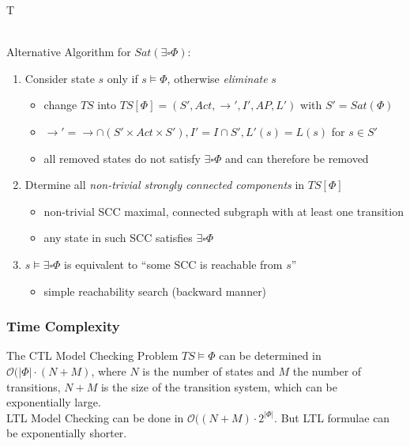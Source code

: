 \documentclass[a4paper, 10pt]{article}
\begin{document}
\begin{mdframed}
\begin{algorithm}[H]
{{{            
        }
    }
}
\Return T
\end{algorithm}
\ \\ Alternative Algorithm for $Sat(\exists\square\Phi)$: \\
\begin{enumerate}
    \item Consider state $s$ only if $s\models\Phi$, otherwise \emph{eliminate} $s$
    \begin{itemize}
        \item change $TS$ into $TS[\Phi]=(S',Act,\to',I',AP,L')$ with $S'=Sat(\Phi)$
        \item $\to'=\to\cap(S'\times Act\times S'), I'=I\cap S', L'(s)=L(s)$ for $s\in S'$
        \item[\follows] all removed states do not satisfy $\exists\square\Phi$ and can therefore be removed
    \end{itemize}
    \item Dtermine all \emph{non-trivial strongly connected components} in $TS[\Phi]$
    \begin{itemize}
        \item non-trivial SCC \follows maximal, connected subgraph with at least one transition
        \item[\follows] any state in such SCC satisfies $\exists\square\Phi$
    \end{itemize}
    \item $s\models\exists\square\Phi$ is equivalent to ``some SCC is reachable from $s$''
    \begin{itemize}
        \item simple reachability search (backward manner)
    \end{itemize}
\end{enumerate}
\end{mdframed}

\subsubsection{Time Complexity}

The CTL Model Checking Problem $TS\models\Phi$ can be determined in $\mathcal{O}(|\Phi|\cdot(N+M)$, where $N$ is the number of states and $M$ the number of transitions, $N+M$ is the size of the transition system, which can be exponentially large.
\\
LTL Model Checking can be done in $\mathcal{O}((N+M)\cdot 2^{|\Phi|}$. But LTL formulae can be exponentially shorter.
\end{document}
